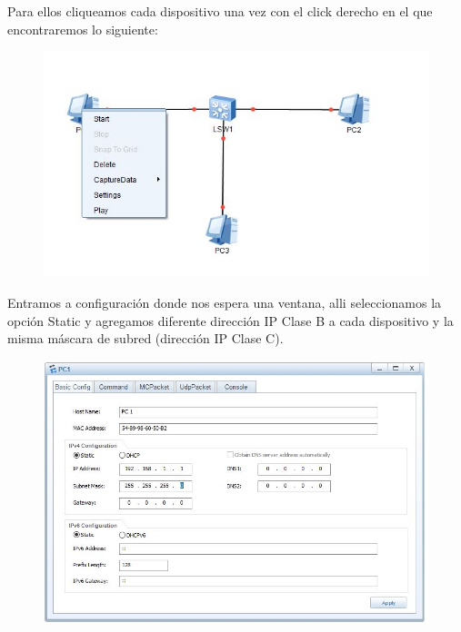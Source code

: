 \documentclass[journal]{IEEEtran}
\begin{document}
Para ellos cliqueamos cada dispositivo una vez con el click derecho en el que encontraremos lo siguiente:
\begin{center}
\begin{figure}[H]
\centering
\includegraphics[scale=0.55]{8.JPG} 
\end{figure}
\end{center}
Entramos a configuración donde nos espera una ventana, alli seleccionamos la opción Static y agregamos diferente dirección IP Clase B a cada dispositivo y la misma máscara de subred (dirección IP Clase C).
\begin{center}
\begin{figure}[H]
\centering
\includegraphics[scale=0.47]{9.JPG} 
\end{figure}
\end{center}
\end{document}
